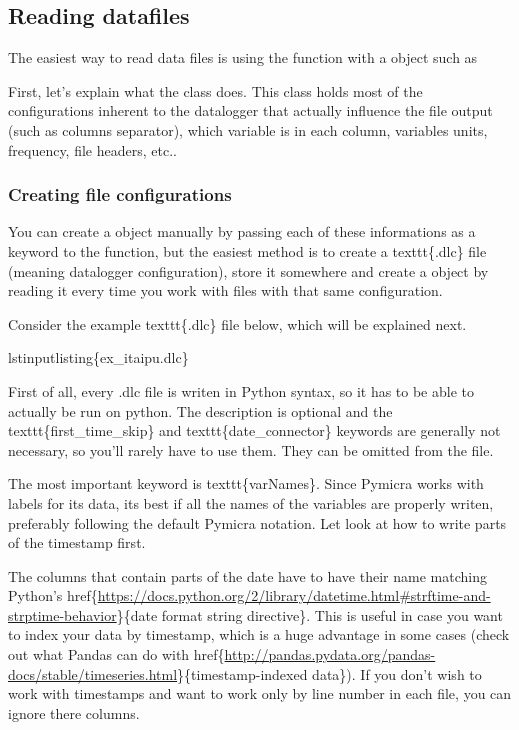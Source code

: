 \documentclass[a4paper,10pt,english]{sphinxmanual}
\begin{document}
\subsection{Reading datafiles}
\label{tutorial:index-0}\label{tutorial:reading-datafiles}
The easiest way to read data files is using the  function with a
 object such as

First,
let's explain what the  class does. This class holds
most of the configurations inherent to the datalogger that actually influence
the file output (such as columns separator), which variable is in each column,
variables units, frequency, file headers, etc..


\subsubsection{Creating file configurations}
\label{tutorial:creating-file-configurations}
You can create a  object manually by passing each of
these informations as a keyword to the  function, but
the easiest method is to create a texttt\{.dlc\} file (meaning datalogger
configuration), store it somewhere and create a  object
by reading it every time you work with files with that same configuration.

Consider the example texttt\{.dlc\} file below, which will be explained next.

lstinputlisting\{ex\_itaipu.dlc\}

First of all, every .dlc file is writen in Python syntax, so it has to be able
to actually be run on python. The description is optional and the
texttt\{first\_time\_skip\} and texttt\{date\_connector\} keywords are generally
not necessary, so you'll rarely have to use them. They can be omitted from the
file.

The most important keyword is texttt\{varNames\}. Since Pymicra works with labels for its
data, its best if all the names of the variables are properly writen, preferably
following the default Pymicra notation. Let look at how to write parts of the
timestamp first.

The columns that contain parts of the date have to have their name matching
Python's
href\{\url{https://docs.python.org/2/library/datetime.html\#strftime-and-strptime-behavior}\}\{date
format string directive\}. This is useful in case you want to index your data by
timestamp, which is a huge advantage in some cases (check out what Pandas can do
with
href\{\url{http://pandas.pydata.org/pandas-docs/stable/timeseries.html}\}\{timestamp-indexed
data\}). If you don't wish to work with timestamps and want to work only by line
number in each file, you can ignore there columns.
\end{document}
